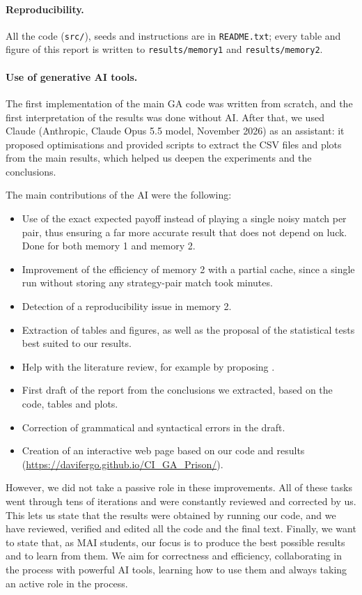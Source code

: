 \documentclass[10pt,a4paper]{article}
\begin{document}
\paragraph{Reproducibility.} All the code (\texttt{src/}), seeds and instructions are in \texttt{README.txt};
every table and figure of this report is written to \texttt{results/memory1} and \texttt{results/memory2}.

\paragraph{Use of generative AI tools.} The first implementation of the main GA code was written from scratch, and
the first interpretation of the results was done without AI. After that, we used Claude (Anthropic, Claude Opus 5.5 model, November 2026)
as an assistant: it proposed optimisations and provided scripts to extract the CSV files and plots
from the main results, which helped us deepen the experiments and the conclusions.

The main contributions of the AI were the following:
\begin{itemize}\setlength{\itemsep}{0pt}
    \item Use of the exact expected payoff instead of playing a single noisy match per pair,
    thus ensuring a far more accurate result that does not depend on luck. Done for both memory 1 and memory 2.
    \item Improvement of the efficiency of memory 2 with a partial cache, since a single run without storing any
    strategy-pair match took minutes.
    \item Detection of a reproducibility issue in memory 2.
    \item Extraction of tables and figures, as well as the proposal of the statistical tests best suited to our results.
    \item Help with the literature review, for example by proposing \cite{axelrod1987}.
    \item First draft of the report from the conclusions we extracted, based on the code, tables and plots.
    \item Correction of grammatical and syntactical errors in the draft.
    \item Creation of an interactive web page based on our code and results (\url{https://davifergo.github.io/CI_GA_Prison/}).
\end{itemize}

However, we did not take a passive role in these improvements. All of these tasks went through tens of iterations
and were constantly reviewed and corrected by us. This lets us state that the results were obtained by running our code, and we have reviewed, verified and edited all
the code and the final text.
Finally, we want to state that, as MAI students, our focus is to produce the best possible results and to learn from them.
We aim for correctness and efficiency, collaborating in the process with powerful AI tools, learning how to use them and
always taking an active role in the process.
\end{document}
